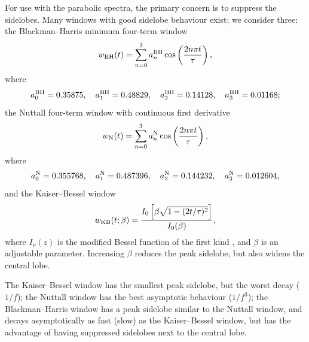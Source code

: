 For use with the parabolic spectra, the primary concern is to suppress the sidelobes. Many windows with good sidelobe behaviour exist; we consider three: the Blackman--Harris minimum four-term window \citep{Harris1978, Nuttall1981}
\begin{equation}
w_\mathrm{BH}(t) = \sum_{n=0}^{3} a^\mathrm{BH}_n\cos\left(\dfrac{2n\pi t}{\tau}\right),
\end{equation}
where
\begin{equation}
a^\mathrm{BH}_0 = 0.35875, \quad a^\mathrm{BH}_1 = 0.48829, \quad
a^\mathrm{BH}_2 = 0.14128, \quad a^\mathrm{BH}_3 = 0.01168;
\end{equation}
the Nuttall four-term window with continuous first derivative \citep{Nuttall1981}
\begin{equation}
w_\mathrm{N}(t) = \sum_{n=0}^{3} a^\mathrm{N}_n\cos\left(\dfrac{2n\pi t}{\tau}\right),
\end{equation}
where
\begin{equation}
a^\mathrm{N}_0 = 0.355768, \quad a^\mathrm{N}_1 = 0.487396, \quad
a^\mathrm{N}_2 = 0.144232, \quad a^\mathrm{N}_3 = 0.012604,
\end{equation}
and the Kaiser--Bessel window \citep{Harris1978, Kaiser1980}
\begin{equation}
w_\mathrm{KB}(t;\beta) = \dfrac{I_0\left[\beta\sqrt{1 - (2 t/\tau)^2}\right]}{I_0(\beta)},
\end{equation}
where $I_\nu(z)$ is the modified Bessel function of the first kind \citep[10.25.2]{Olver2010}, and $\beta$ is an adjustable parameter. Increasing $\beta$ reduces the peak sidelobe, but also widens the central lobe.

The Kaiser--Bessel window has the smallest peak sidelobe, but the worst decay ($1/f$); the Nuttall window has the best asymptotic behaviour ($1/f^3$); the Blackman--Harris window has a peak sidelobe similar to the Nuttall window, and decays asymptotically as fast (slow) as the Kaiser--Bessel window, but has the advantage of having suppressed sidelobes next to the central lobe.

